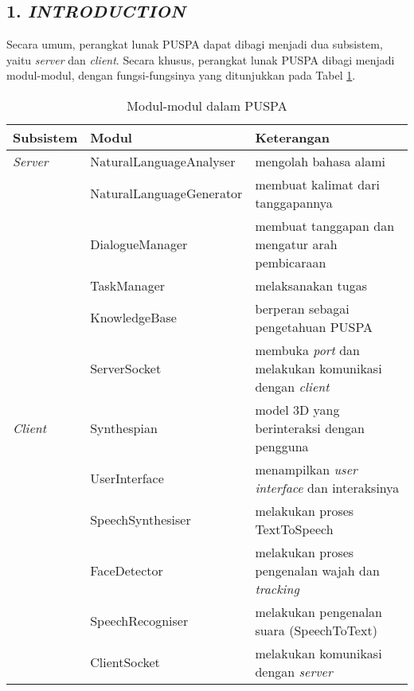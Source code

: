 \subsection*{\textcolor{subsectioncolor}{\textsf{1. \textit{INTRODUCTION}}}}


Secara umum, perangkat lunak PUSPA dapat dibagi menjadi dua subsistem,
yaitu \textit{server} dan \textit{client}.
Secara khusus, perangkat lunak PUSPA dibagi menjadi modul-modul,
dengan fungsi-fungsinya yang ditunjukkan pada Tabel \ref{FungsiPerangkatLunak}.

\begin{table}
	\centering
		\begin{tabular}{|p{1.8cm}|p{4.7cm}|p{8cm}|}
			\hline
				Subsistem & Modul & Keterangan\\
			\hline
				\textit{Server} & NaturalLanguageAnalyser & mengolah bahasa alami\\
				& NaturalLanguageGenerator & membuat kalimat dari tanggapannya\\
				& DialogueManager & membuat tanggapan dan mengatur arah pembicaraan\\
				& TaskManager & melaksanakan tugas\\
				& KnowledgeBase & berperan sebagai pengetahuan PUSPA\\
				& ServerSocket & membuka \textit{port} dan melakukan komunikasi dengan \textit{client}\\
			\hline
				\textit{Client} & Synthespian & model 3D yang berinteraksi dengan pengguna\\
				& UserInterface & menampilkan \textit{user interface} dan interaksinya\\
				& SpeechSynthesiser & melakukan proses TextToSpeech\\
				& FaceDetector & melakukan proses pengenalan wajah dan \textit{tracking}\\
				& SpeechRecogniser & melakukan pengenalan suara (SpeechToText)\\
				& ClientSocket & melakukan komunikasi dengan \textit{server}\\			
			\hline
		\end{tabular}
\caption{Modul-modul dalam PUSPA}
\label{FungsiPerangkatLunak}
\end{table}
